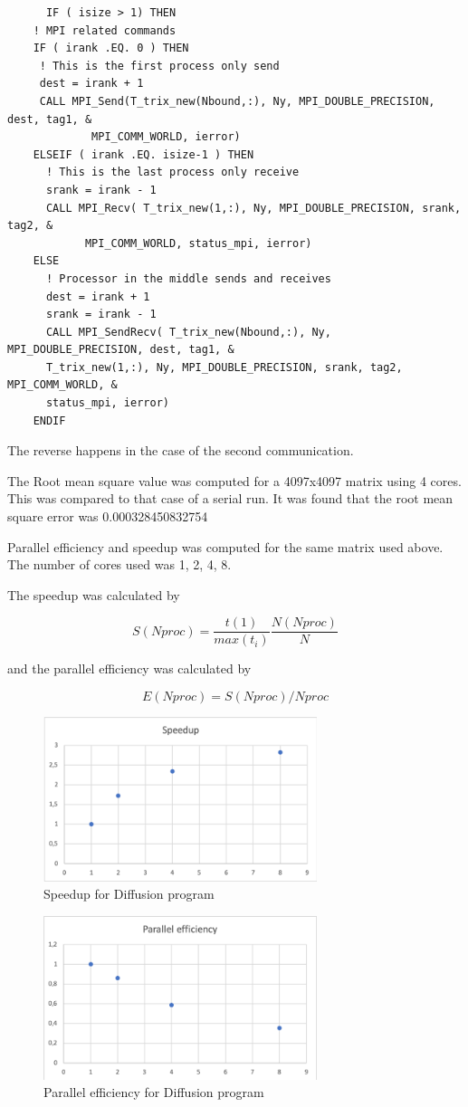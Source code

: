 \documentclass{article}
\begin{document}
\begin{verbatim}
      IF ( isize > 1) THEN
    ! MPI related commands
    IF ( irank .EQ. 0 ) THEN
     ! This is the first process only send
     dest = irank + 1
     CALL MPI_Send(T_trix_new(Nbound,:), Ny, MPI_DOUBLE_PRECISION, dest, tag1, &
             MPI_COMM_WORLD, ierror)
    ELSEIF ( irank .EQ. isize-1 ) THEN
      ! This is the last process only receive
      srank = irank - 1
      CALL MPI_Recv( T_trix_new(1,:), Ny, MPI_DOUBLE_PRECISION, srank, tag2, &
            MPI_COMM_WORLD, status_mpi, ierror)
    ELSE
      ! Processor in the middle sends and receives
      dest = irank + 1
      srank = irank - 1
      CALL MPI_SendRecv( T_trix_new(Nbound,:), Ny, MPI_DOUBLE_PRECISION, dest, tag1, &
      T_trix_new(1,:), Ny, MPI_DOUBLE_PRECISION, srank, tag2, MPI_COMM_WORLD, &
      status_mpi, ierror)
    ENDIF
\end{verbatim}

The reverse happens in the case of the second communication.


The Root mean square value was computed for a 4097x4097 matrix using 4 cores. This was compared to that case of a serial run. It was found that the root mean square error was 0.000328450832754


Parallel efficiency and speedup was computed for the same matrix used above. The number of cores used was 1, 2, 4, 8. 

The speedup was calculated by 

\begin{equation}
    S(Nproc) = \frac{t(1)}{max(t_{i})} \frac{N(Nproc)}{N}
\end{equation}

and the parallel efficiency was calculated by 

\begin{equation}
    E(Nproc) = S(Nproc) / Nproc
\end{equation}

\begin{figure}
    \centering
    \includegraphics[width=8cm]{figures/speedup_diff.png}
    \caption{Speedup for Diffusion program}
    \label{fig:my_label}
\end{figure}

\begin{figure}
    \centering
    \includegraphics[width=8cm]{figures/parallel_efficiency_diff.png}
    \caption{Parallel efficiency for Diffusion program}
    \label{fig:my_label}
\end{figure}
\end{document}
